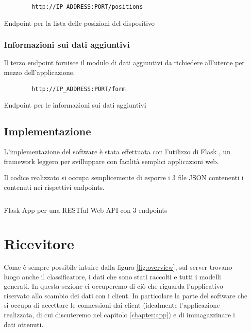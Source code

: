 \begin{listing}[H] 
    \begin{verbatim}
        http://IP_ADDRESS:PORT/positions
    \end{verbatim}
    \caption{Endpoint per la lista delle posizioni del dispositivo}
\end{listing}

\subsubsection{Informazioni sui dati aggiuntivi}
Il terzo endpoint fornisce il modulo di dati aggiuntivi da richiedere all'utente per mezzo dell'applicazione.

\begin{listing}[H] 
    \begin{verbatim}
        http://IP_ADDRESS:PORT/form
    \end{verbatim}
    \caption{Endpoint per le informazioni sui dati aggiuntivi}
\end{listing}

\subsection{Implementazione}
L'implementazione del software è stata effettuata con l'utilizzo di Flask \cite{flask}, un framework leggero 
per svilluppare con facilità semplici applicazioni web.

Il codice realizzato si occupa semplicemente di esporre i 3 file JSON contenenti i contenuti nei rispettivi endpoints.

\begin{listing}[H] 
    \inputminted[frame=single,framesep=10pt]{python}{snippets/server/api/flask.py}
    \caption{Flask App per una RESTful Web API con 3 endpoints}
\end{listing}



\section{Ricevitore}
Come è sempre possibile intuire dalla figura \ref{fig:overview}, sul server trovano luogo anche il classificatore, 
i dati che sono stati raccolti e tutti i modelli generati. 
In questa sezione ci occuperemo di ciò che riguarda l'applicativo riservato allo scambio dei dati con i client. In particolare
la parte del software che si occupa di accettare le connessioni dai client (idealmente l'applicazione realizzata, di cui 
discuteremo nel capitolo \ref{chapter:app}) e di immagazzinare i dati ottenuti.

